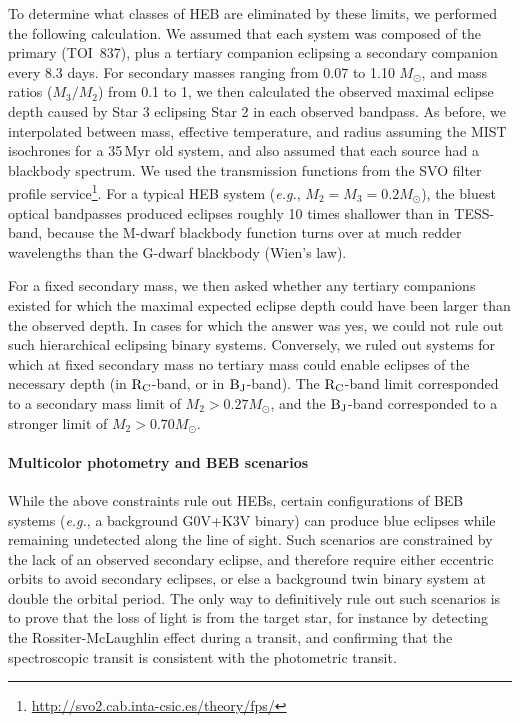 \documentclass[12pt,twocolumn,tighten]{aastex63}
\newcommand{\tn}{TOI~837} %
\begin{document}
To determine what classes of HEB are eliminated by these limits, we
performed the following calculation.  We assumed that each system was
composed of the primary (\tn), plus a tertiary companion eclipsing a
secondary companion every 8.3 days.  For secondary masses ranging from
0.07 to 1.10 $M_\odot$, and mass ratios ($M_3/M_2$) from 0.1 to 1, we
then calculated the observed maximal eclipse depth caused by Star 3
eclipsing Star 2 in each observed bandpass.  As before, we
interpolated between mass, effective temperature, and radius assuming
the MIST isochrones for a 35$\,$Myr old system, and also assumed that
each source had a blackbody spectrum.  We used the transmission
functions from the SVO filter profile
service\footnote{\url{http://svo2.cab.inta-csic.es/theory/fps/}}.  For
a typical HEB system ({\it e.g.}, $M_2=M_3=0.2M_\odot$), the bluest
optical bandpasses produced eclipses roughly 10 times shallower than
in TESS-band, because the M-dwarf blackbody function turns over at
much redder wavelengths than the G-dwarf blackbody (Wien's law).

For a fixed secondary mass, we then asked whether any tertiary
companions existed for which the maximal expected eclipse depth could
have been larger than the observed depth.  In cases for which the
answer was yes, we could not rule out such hierarchical eclipsing
binary systems.  Conversely, we ruled out systems for which at
fixed secondary mass no tertiary mass could enable eclipses of the
necessary depth (in ${\rm R_C}$-band, or in ${\rm B_J}$-band).  The
${\rm R_C}$-band limit corresponded to a secondary mass limit of $M_2
> 0.27 M_\odot$, and the ${\rm B_J}$-band corresponded to a stronger
limit of $M_2 > 0.70 M_\odot$.


\paragraph{Multicolor photometry and BEB scenarios}

While the above constraints rule out HEBs, certain configurations of
BEB systems ({\it e.g.}, a background G0V+K3V binary) can produce blue
eclipses while remaining undetected along the line of sight.  Such
scenarios are constrained by the lack of an observed secondary
eclipse, and therefore require either eccentric orbits to avoid
secondary eclipses, or else a background twin binary system at double
the orbital period.  The only way to definitively rule out such
scenarios is to prove that the loss of light is from the target star,
for instance by detecting the Rossiter-McLaughlin effect during a
transit, and confirming that the spectroscopic transit is consistent
with the photometric transit.
\end{document}
